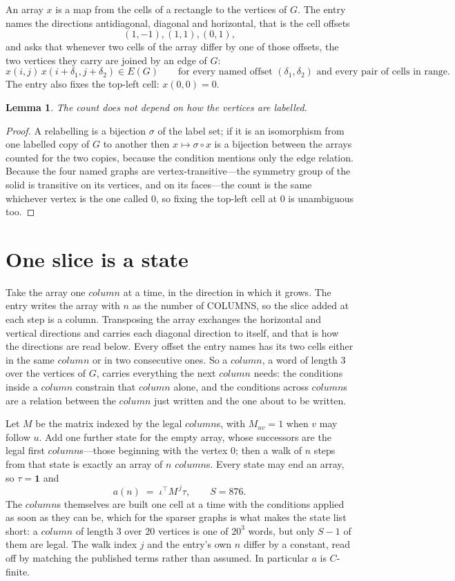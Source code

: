 \documentclass[11pt,a4paper]{article}
\theoremstyle{plain}
\newtheorem{lemma}[theorem]{Lemma}
\theoremstyle{definition}
\begin{document}
An array $x$ is a map from the cells of a rectangle to the vertices of $G$. The entry names the
directions antidiagonal, diagonal and horizontal, that is the cell offsets
\[
(1,-1), (1,1), (0,1),
\]
and asks that whenever two cells of the array differ by one of those offsets, the two vertices
they carry are joined by an edge of $G$:
\[
x(i,j)\,x(i+\delta_1,j+\delta_2)\in E(G)\qquad
\text{for every named offset } (\delta_1,\delta_2)\text{ and every pair of cells in range.}
\]
The entry also fixes the top-left cell: $x(0,0)=0$.

\begin{lemma}\label{lem:label}
The count does not depend on how the vertices are labelled.
\end{lemma}

\begin{proof}
A relabelling is a bijection $\sigma$ of the label set; if it is an isomorphism from one
labelled copy of $G$ to another then $x\mapsto\sigma\circ x$ is a bijection between the arrays
counted for the two copies, because the condition mentions only the edge relation.
Because the four named graphs are vertex-transitive---the symmetry group of the solid is transitive on its vertices, and on its faces---the count is the same whichever vertex is the one called $0$, so fixing the top-left cell at $0$ is unambiguous too.
\end{proof}

\section{One slice is a state}

Take the array one $column$ at a time, in the direction in which it grows. The entry writes the array with $n$ as the number of COLUMNS, so the slice added at each step is a column. Transposing the array exchanges the horizontal and vertical directions and carries each diagonal direction to itself, and that is how the directions are read below.
Every offset the entry names has its two cells either in the same $column$ or in two
consecutive ones. So a $column$, a word of length $3$ over the vertices of $G$, carries
everything the next $column$ needs: the conditions inside a $column$ constrain that
$column$ alone, and the conditions across $column$s are a relation between the
$column$ just written and the one about to be written.

Let $M$ be the matrix indexed by the legal $column$s, with $M_{uv}=1$ when $v$ may
follow $u$. Add one further state for the empty array, whose successors are the legal first
$column$s---those beginning with the vertex $0$; then a walk of
$n$ steps from that state is exactly an array of $n$ $column$s. Every state may end an
array, so $\tau=\mathbf{1}$ and
\[
a(n)\;=\;\iota^{\!\top}M^{\,j}\tau ,\qquad S=876.
\]
The $column$s themselves are built one cell at a time with the conditions applied as soon
as they can be, which for the sparser graphs is what makes the state list short: a $column$
of length $3$ over $20$ vertices is one of $20^{3}$ words, but only $S-1$ of them are
legal. The walk index $j$ and the entry's own $n$ differ by a constant, read off by matching the
published terms rather than assumed. In particular $a$ is $C$-finite.
\end{document}
